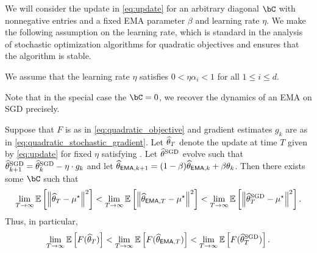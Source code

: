 We will consider the update in \eqref{eq:update} for an arbitrary diagonal $\bC$ with nonnegative entries and a fixed EMA parameter $\beta$ and learning rate $\eta$.  We make the following assumption on the learning rate, which is standard in the analysis of stochastic optimization algorithms for quadratic objectives \citep{zhang2019algorithmic} and ensures that the algorithm is stable.
\begin{assumption}\label{ass:stable_learning}
    We assume that the learning rate $\eta$ satisfies $0 < \eta \alpha_i < 1$ for all $1 \leq i \leq d$.
\end{assumption}
Note that in the special case the $\bC = 0$, we recover the dynamics of an EMA on SGD precisely.
\begin{proposition}\label{prop:improved_convergence_quadratic_tight}
    Suppose that $F$ is as in \eqref{eq:quadratic_objective} and gradient estimates $g_k$ are as in \eqref{eq:quadratic_stochastic_gradient}.  Let $\thetahat_T$ denote the update at time $T$ given by \eqref{eq:update} for fixed $\eta$ satisfying .  Let $\thetasgd$ evolve such that $\thetasgd_{k+1} = \thetasgd_k - \eta \cdot g_k$ and let $\thetema[k+1] = (1 - \beta) \thetema[k] + \beta \theta_k$.  Then there exists some $\bC$ such that
    \begin{align}
        \lim_{T \to \infty} \ee\left[ \norm{\thetahat_T - \mustar}^2 \right] < \lim_{T \to \infty} \ee\left[ \norm{\thetema[T] - \mustar}^2 \right] < \lim_{T \to \infty} \ee\left[ \norm{\thetasgd_T - \mustar}^2 \right].
    \end{align}
    Thus, in particular,
    \begin{align}
        \lim_{T \to \infty} \ee\left[ F(\thetahat_T) \right] < \lim_{T \to \infty} \ee\left[ F(\thetema[T]) \right] < \lim_{T \to \infty} \ee\left[ F(\thetasgd_T) \right].
    \end{align}
\end{proposition}
